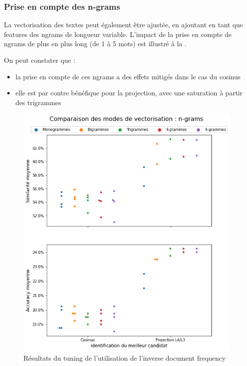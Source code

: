             \subsubsection{Prise en compte des n-grams}

            La vectorisation des textes peut également être ajustée, en ajoutant en tant que features des ngrams de longueur variable.
            L'impact de la prise en compte de ngrams de plus en plus long (de 1 à 5 mots) est illustré à la .

            On peut constater que :
            \begin{itemize}
                \item la prise en compte de ces ngrams a des effets mitigés dans le cas du cosinus
                \item elle est par contre bénéfique pour la projection, avec une saturation à partir des trigrammes
            \end{itemize}

            \begin{figure}[htbp]
                \begin{center}
                \includegraphics[width=0.9\linewidth]{img/tuning_ngrams.png}
                \end{center}
                \caption{Résultats du tuning de l'utilisation de l'inverse document frequency}
                \label{fig:tuning_ngrams}
            \end{figure}

